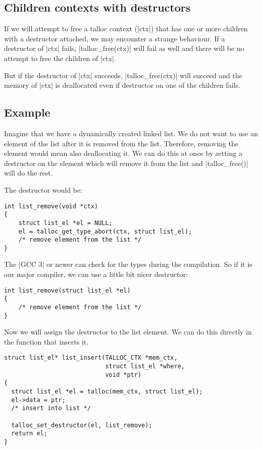 \subsection{Children contexts with destructors}

If we will attempt to free a talloc context (|ctx|) that has one or more
children with a destructor attached, we may encounter a strange behaviour. If a
destructor of |ctx| fails, |talloc_free(ctx)| will fail as well and there will
be no attempt to free the children of |ctx|.

But if the destructor of |ctx| succeeds, |talloc_free(ctx)| will succeed and
the memory of |ctx| is deallocated even if destructor on one of the children
fails.

\subsection{Example}

Imagine that we have a dynamically created linked list. We do not want to use an
element of the list after it is removed from the list. Therefore, removing the
element would mean also deallocating it. We can do this at once by setting a
destructor on the element which will remove it from the list and
|talloc_free()| will do the rest.

The destructor would be:

\begin{lstlisting}[caption={Remove an element from the list -- destructor}]
int list_remove(void *ctx)
{
    struct list_el *el = NULL;
    el = talloc_get_type_abort(ctx, struct list_el);
    /* remove element from the list */    
}
\end{lstlisting}

\noindent
The |GCC 3| or newer can check for the types during the compilation. So if it is
our major compiler, we can use a little bit nicer destructor:

\begin{lstlisting}[caption={Remove an element from the list -- type safe
destructor}]
int list_remove(struct list_el *el)
{
    /* remove element from the list */    
}
\end{lstlisting}

\noindent
Now we will assign the destructor to the list element. We can do this directly
in the function that inserts it.

\begin{lstlisting}[caption={Remove an element from the list when freed},
morekeywords={talloc_set_destructor}]
struct list_el* list_insert(TALLOC_CTX *mem_ctx,
                            struct list_el *where,
                            void *ptr)
{
  struct list_el *el = talloc(mem_ctx, struct list_el);
  el->data = ptr;
  /* insert into list */
  
  talloc_set_destructor(el, list_remove);
  return el;
}
\end{lstlisting}

